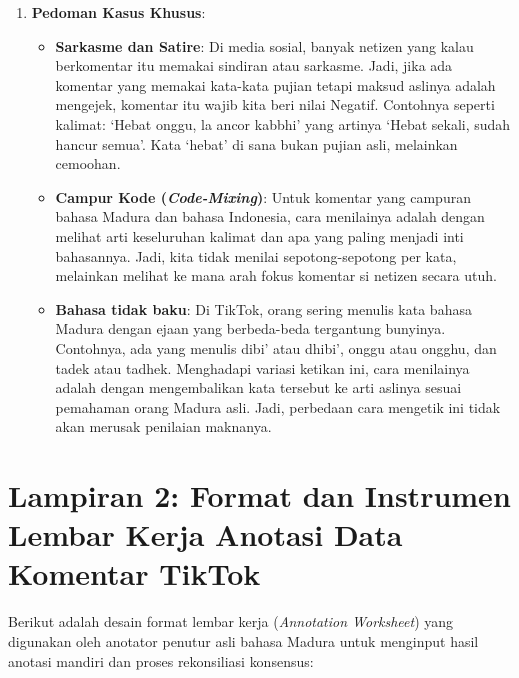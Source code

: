 \begin{enumerate}
    \item \textbf{Pedoman Kasus Khusus}:
    \begin{itemize}
        \item \textbf{Sarkasme dan Satire}: Di media sosial, banyak netizen yang kalau berkomentar itu memakai sindiran atau sarkasme. Jadi, jika ada komentar yang memakai kata-kata pujian tetapi maksud aslinya adalah mengejek, komentar itu wajib kita beri nilai Negatif. Contohnya seperti kalimat: `Hebat onggu, la ancor kabbhi' yang artinya `Hebat sekali, sudah hancur semua'. Kata `hebat' di sana bukan pujian asli, melainkan cemoohan.
        \item \textbf{Campur Kode (\textit{Code-Mixing})}: Untuk komentar yang campuran bahasa Madura dan bahasa Indonesia, cara menilainya adalah dengan melihat arti keseluruhan kalimat dan apa yang paling menjadi inti bahasannya. Jadi, kita tidak menilai sepotong-sepotong per kata, melainkan melihat ke mana arah fokus komentar si netizen secara utuh.
        \item \textbf{Bahasa tidak baku}: Di TikTok, orang sering menulis kata bahasa Madura dengan ejaan yang berbeda-beda tergantung bunyinya. Contohnya, ada yang menulis dibi’ atau dhibi’, onggu atau ongghu, dan tadek atau tadhek. Menghadapi variasi ketikan ini, cara menilainya adalah dengan mengembalikan kata tersebut ke arti aslinya sesuai pemahaman orang Madura asli. Jadi, perbedaan cara mengetik ini tidak akan merusak penilaian maknanya.
    \end{itemize}
\end{enumerate}

\newpage

\section*{Lampiran 2: Format dan Instrumen Lembar Kerja Anotasi Data Komentar TikTok}

Berikut adalah desain format lembar kerja (\textit{Annotation Worksheet}) yang digunakan oleh anotator penutur asli bahasa Madura untuk menginput hasil anotasi mandiri dan proses rekonsiliasi konsensus:

